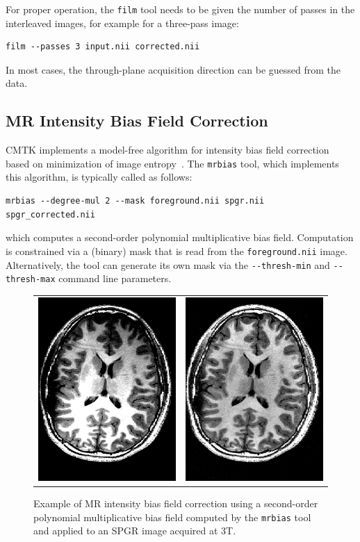 \documentclass{InsightArticle}
\begin{document}
For proper operation, the \verb|film| tool needs to be given the number of
passes in the interleaved images, for example for a three-pass image:
\begin{verbatim}
film --passes 3 input.nii corrected.nii
\end{verbatim}
In most cases, the through-plane acquisition direction can be guessed from the
data.

\subsection{MR Intensity Bias Field Correction}

CMTK implements a model-free algorithm for intensity bias field correction
based on minimization of image entropy~\cite{LikaVierPern:2001}. The
\verb|mrbias| tool, which implements this algorithm, is typically called as
follows:
\begin{verbatim}
mrbias --degree-mul 2 --mask foreground.nii spgr.nii spgr_corrected.nii
\end{verbatim}
which computes a second-order polynomial multiplicative bias
field. Computation is constrained via a (binary) mask that is read from the
\verb|foreground.nii| image. Alternatively, the tool can generate its own mask
via the \verb|--thresh-min| and  \verb|--thresh-max| command line parameters.

\begin{figure}[tbp]
\begin{center}
\begin{tabular}{cc}
\includegraphics[width=.3\linewidth]{img/mrbias_orig}&
\includegraphics[width=.3\linewidth]{img/mrbias_corr}
\end{tabular}
\end{center}
\caption{Example of MR intensity bias field correction using a second-order
polynomial multiplicative bias field computed by the {\tt mrbias} tool and
applied to an SPGR image acquired at 3T.}
\label{fig:Mrbias}
\end{figure}
\end{document}
